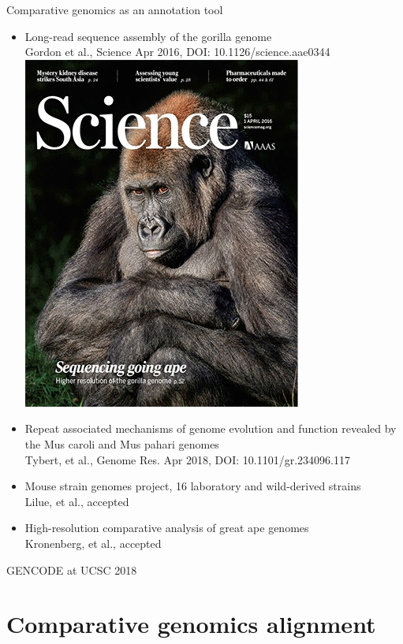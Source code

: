 \documentclass[10pt,
               hyperref={bookmarks=false,
                         bookmarksopen=false,
                         colorlinks=true,
                         linkcolor=blue,
                         urlcolor=blue},
               xcolor={svgnames,table}]{beamer}
\newcommand{\sectionframe}[1]{
  \begin{frame}{GENCODE at UCSC 2018}
    \section{#1}
  \end{frame}
}
\begin{document}
\begin{frame}{Comparative genomics as an annotation tool}
  \begin{itemize}
  \item Long-read sequence assembly of the gorilla genome \\
    Gordon et al., Science Apr 2016, DOI: 10.1126/science.aae0344 \\
    \includegraphics[scale=0.1]{images/science-gorilla.jpg}
  \item Repeat associated mechanisms of genome evolution and function revealed by the Mus caroli and Mus pahari genomes \\
    Tybert, et al., Genome Res. Apr 2018, DOI: 10.1101/gr.234096.117
  \item Mouse strain genomes project, 16 laboratory and wild-derived strains \\
    Lilue, et al., accepted
  \item High-resolution comparative analysis of great ape genomes \\
    Kronenberg, et al., accepted
  \end{itemize}
\end{frame}

\sectionframe{Comparative genomics alignment}
\end{document}
